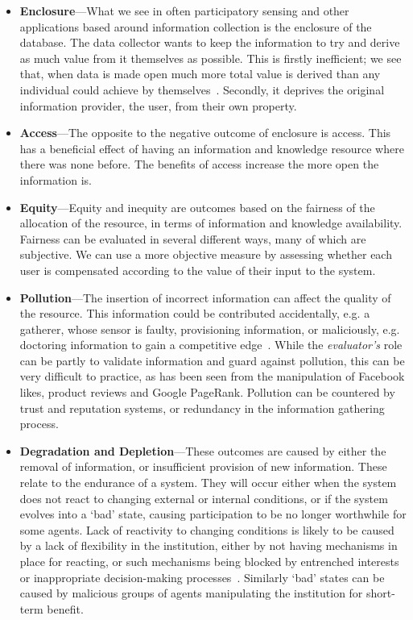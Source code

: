 \begin{itemize}

\item \textbf{Enclosure}---What we see in often participatory sensing and other applications based around information collection is the enclosure of the database. 
The data collector wants to keep the information to try and derive as much value from it themselves as possible. 
This is firstly inefficient; we see that, when data is made open much more total value is derived than any individual could achieve by themselves~\citep{Shadbolt2012}. 
Secondly, it deprives the original information provider, the user, from their own property. 

\item \textbf{Access}---The opposite to the negative outcome of enclosure is access. 
This has a beneficial effect of having an information and knowledge resource where there was none before. 
The benefits of access increase the more open the information is.

\item \textbf{Equity}---Equity and inequity are outcomes based on the fairness of the allocation of the resource, in terms of information and knowledge availability. Fairness can be evaluated in several different ways, many of which are subjective. We can use a more objective measure by assessing whether each user is compensated according to the value of their input to the system. 


\item \textbf{Pollution}---The insertion of incorrect information can affect the quality of the resource. 
This information could be contributed accidentally, e.g. a gatherer, whose sensor is faulty, provisioning information, or maliciously, e.g. doctoring information to gain a competitive edge~\citep{Oreskes2010}. While the \emph{evaluator's} role can be partly to validate information and guard against pollution, this can be very difficult to practice, as has been seen from the manipulation of Facebook likes, product reviews and Google PageRank. %
Pollution can be countered by trust and reputation systems, or redundancy in the information gathering process.

\item \textbf{Degradation and Depletion}---These outcomes are caused by either the removal of information, or insufficient provision of new information. 
These relate to the endurance of a system. They will occur either when the system does not react to changing external or internal conditions,  or if the system evolves into a `bad' state, causing participation to be no longer worthwhile for some agents. 
Lack of reactivity to changing conditions is likely to be caused by a lack of flexibility in the institution, either by not having mechanisms in place for reacting, or such mechanisms being blocked by entrenched interests or inappropriate decision-making processes~\cite{North1990}. 
Similarly `bad' states can be caused by malicious groups of agents manipulating the institution for short-term benefit.


\end{itemize}
